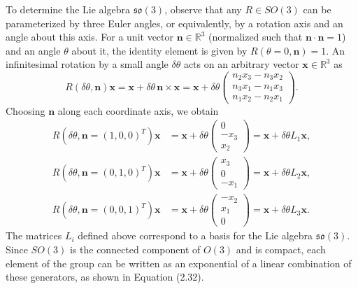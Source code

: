 To determine the Lie algebra $\mathfrak{so}(3)$, observe that any $R \in SO(3)$ can be parameterized by three Euler angles, or equivalently, by a rotation axis and an angle about this axis. For a unit vector $\mathbf{n} \in \mathbb{R}^3$ (normalized such that $\mathbf{n} \cdot \mathbf{n} = 1$) and an angle $\theta$ about it, the identity element is given by $R(\theta = 0, \mathbf{n}) = 1$. An infinitesimal rotation by a small angle $\delta \theta$ acts on an arbitrary vector $\mathbf{x} \in \mathbb{R}^3$ as
\[
R(\delta \theta, \mathbf{n}) \mathbf{x} = \mathbf{x} + \delta \theta \, \mathbf{n} \times \mathbf{x} = \mathbf{x} + \delta \theta \begin{pmatrix} n_2 x_3 - n_3 x_2 \\ n_3 x_1 - n_1 x_3 \\ n_1 x_2 - n_2 x_1 \end{pmatrix}.
\]
Choosing $\mathbf{n}$ along each coordinate axis, we obtain
\begin{subequations}
    \begin{align}
        R(\delta \theta, \mathbf{n} = (1, 0, 0)^T) \mathbf{x} &= \mathbf{x} + \delta \theta \begin{pmatrix} 0 \\ -x_3 \\ x_2 \end{pmatrix} = \mathbf{x} + \delta \theta L_1 \mathbf{x}, \\
        R(\delta \theta, \mathbf{n} = (0, 1, 0)^T) \mathbf{x} &= \mathbf{x} + \delta \theta \begin{pmatrix} x_3 \\ 0 \\ -x_1 \end{pmatrix} = \mathbf{x} + \delta \theta L_2 \mathbf{x}, \\
        R(\delta \theta, \mathbf{n} = (0, 0, 1)^T) \mathbf{x} &= \mathbf{x} + \delta \theta \begin{pmatrix} -x_2 \\ x_1 \\ 0 \end{pmatrix} = \mathbf{x} + \delta \theta L_3 \mathbf{x}.
    \end{align}
\end{subequations}
The matrices $L_i$ defined above correspond to a basis for the Lie algebra $\mathfrak{so}(3)$. Since $SO(3)$ is the connected component of $O(3)$ and is compact, each element of the group can be written as an exponential of a linear combination of these generators, as shown in Equation (2.32).

